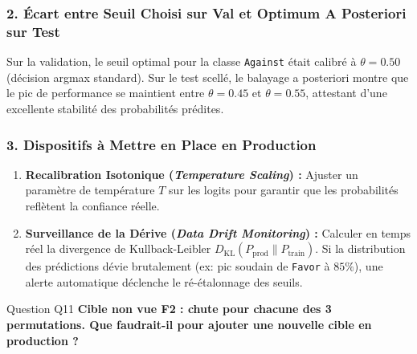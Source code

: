 \documentclass[11pt,a4paper]{article}
\begin{document}
\subsubsection*{2. Écart entre Seuil Choisi sur Val et Optimum A Posteriori sur Test}
Sur la validation, le seuil optimal pour la classe \texttt{Against} était calibré à $\theta = 0.50$ (décision argmax standard). Sur le test scellé, le balayage a posteriori montre que le pic de performance se maintient entre $\theta = 0.45$ et $\theta = 0.55$, attestant d'une excellente stabilité des probabilités prédites.

\subsubsection*{3. Dispositifs à Mettre en Place en Production}
\begin{enumerate}[noitemsep]
    \item \textbf{Recalibration Isotonique (\textit{Temperature Scaling}) :} Ajuster un paramètre de température $T$ sur les logits pour garantir que les probabilités reflètent la confiance réelle.
    \item \textbf{Surveillance de la Dérive (\textit{Data Drift Monitoring}) :} Calculer en temps réel la divergence de Kullback-Leibler $D_{\text{KL}}(P_{\text{prod}} \parallel P_{\text{train}})$. Si la distribution des prédictions dévie brutalement (ex: pic soudain de \texttt{Favor} à $85\%$), une alerte automatique déclenche le ré-étalonnage des seuils.
\end{enumerate}

\vspace{0.3cm}

\begin{questionbox}{Question Q11}
\textbf{Cible non vue F2 : chute pour chacune des 3 permutations. Que faudrait-il pour ajouter une nouvelle cible en production ?}
\end{questionbox}
\end{document}
